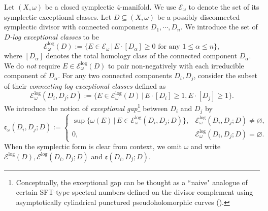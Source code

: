 \documentclass[11pt]{article}
\theoremstyle{definition}
\theoremstyle{remark}
\begin{document}
Let $(X,\omega)$ be a closed symplectic $4$-manifold. We use $\mathcal{E}_\omega$ to denote the set of its symplectic exceptional classes. Let $D\subseteq (X,\omega)$ be a possibly disconnected symplectic divisor with connected components $D_1,\cdots,D_n$. We introduce the set of \emph{$D$-log exceptional classes} to be 
\[\mathcal{E}^{\text{log}}_{\omega}(D):=\{E\in\mathcal{E}_\omega\,|\,E\cdot[D_\alpha]\geq 0\text{ for any }1\leq \alpha\leq n\},\]where $[D_\alpha]$ denotes the total homology class of the connected component $D_\alpha$. We do \emph{not} require $E\in \mathcal{E}_\omega^{\text{log}}(D)$ to pair non-negatively with each irreducible component of $D_\alpha$. For any two connected components $D_i,D_j$, consider the subset of their \emph{connecting log exceptional classes} defined as
\[\mathcal{E}^{\text{log}}_\omega(D_i,D_j;D):=\{E\in\mathcal{E}^{\text{log}}_{\omega}(D)\,|\, E\cdot[D_i]\geq1, E\cdot[D_j]\geq 1\}.\]
 We introduce the notion of
\emph{exceptional gap}\footnote{Conceptually, the exceptional gap can be thought as a ``naive" analogue of certain SFT-type spectral numbers defined on the divisor complement using asymptotically cylindrical punctured pseudoholomorphic curves (\cite{MScapacity}).} between $D_i$ and $D_j$ by 
\[
\mathfrak{e}_\omega(D_i,D_j;D):=
\begin{cases}
\sup\{\omega(E)\,|\,E\in\mathcal{E}^{\text{log}}_\omega(D_i,D_j;D)\}, & \mathcal{E}^{\text{log}}_\omega(D_i,D_j;D)\neq\varnothing,\\
0, & \mathcal{E}^{\text{log}}_\omega(D_i,D_j;D)=\varnothing.
\end{cases}
\]
When the symplectic form is clear from context, we omit $\omega$ and write $\mathcal{E}^{\text{log}}(D),\mathcal{E}^{\text{log}}(D_i,D_j;D)$ and $\mathfrak{e}(D_i,D_j;D)$. 
\end{document}
